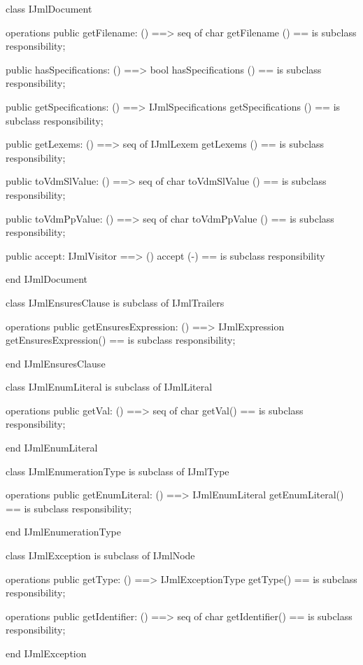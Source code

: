 \begin{vdm_al}
class IJmlDocument

operations
  public getFilename: () ==> seq of char
  getFilename () == is subclass responsibility;

  public hasSpecifications: () ==> bool
  hasSpecifications () == is subclass responsibility;

  public getSpecifications: () ==> IJmlSpecifications
  getSpecifications () == is subclass responsibility;

  public getLexems: () ==> seq of IJmlLexem
  getLexems () == is subclass responsibility;

  public toVdmSlValue: () ==> seq of char
  toVdmSlValue () == is subclass responsibility;

  public toVdmPpValue: () ==> seq of char
  toVdmPpValue () == is subclass responsibility;

  public accept: IJmlVisitor ==> ()
  accept (-) == is subclass responsibility

end IJmlDocument
\end{vdm_al}
\begin{vdm_al}
class IJmlEnsuresClause
 is subclass of IJmlTrailers

operations
  public getEnsuresExpression: () ==> IJmlExpression
  getEnsuresExpression() == is subclass responsibility;

end IJmlEnsuresClause
\end{vdm_al}

\begin{vdm_al}
class IJmlEnumLiteral
 is subclass of IJmlLiteral

operations
  public getVal: () ==> seq of char
  getVal() == is subclass responsibility;

end IJmlEnumLiteral
\end{vdm_al}

\begin{vdm_al}
class IJmlEnumerationType
 is subclass of IJmlType

operations
  public getEnumLiteral: () ==> IJmlEnumLiteral
  getEnumLiteral() == is subclass responsibility;

end IJmlEnumerationType
\end{vdm_al}

\begin{vdm_al}
class IJmlException
 is subclass of IJmlNode

operations
  public getType: () ==> IJmlExceptionType
  getType() == is subclass responsibility;

operations
  public getIdentifier: () ==> seq of char
  getIdentifier() == is subclass responsibility;

end IJmlException
\end{vdm_al}


